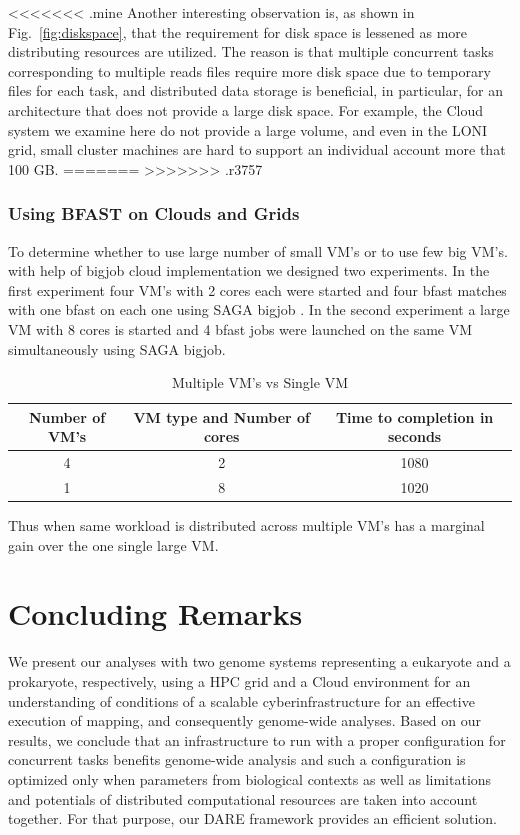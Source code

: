 \documentclass[12pt]{article}
\begin{document}
<<<<<<< .mine
Another interesting observation is, as shown in Fig.~\ref{fig:diskspace}, that the requirement for disk space is lessened as more distributing resources are utilized. The reason is that multiple concurrent tasks corresponding to multiple reads files require more disk space due to temporary files for each task, and distributed data storage is beneficial, in particular, for an architecture that does not provide a large disk space.  For example, the Cloud system we examine here do not provide a large volume, and even in the LONI grid, small cluster machines are hard to support an individual account more that 100 GB.    
=======
>>>>>>> .r3757


\subsubsection{Using BFAST on Clouds and Grids}

To determine whether to use large number of small VM's or to use few big VM's. with help of bigjob cloud implementation we designed two experiments. In the first experiment four VM's with 2 cores each were started and four bfast matches with one bfast on each one using SAGA bigjob . In the second experiment a large VM with 8 cores is started and 4 bfast jobs were launched on the same VM simultaneously using SAGA bigjob.

 \begin{table}
 \begin{tabular}{|c|c|c|} 
 \hline 
Number of VM's & VM type and Number of cores & Time to completion in seconds \\ \hline
4 &  2 & 1080  \\
1 & 8 & 1020\\
 \hline 
 \end{tabular}
 \label{table:cloud VM's} 
 \caption{Multiple VM's vs Single VM}
\end{table}

Thus when same workload is distributed across multiple VM's has a marginal gain over the one single large VM.


\section{Concluding Remarks}
We present our analyses with two genome systems representing a eukaryote and a prokaryote, respectively, using
 a HPC grid and a Cloud environment for an understanding of conditions of a scalable cyberinfrastructure for an effective execution of
 mapping, and consequently genome-wide analyses.   Based on our results, we conclude that an infrastructure to run with a proper configuration for concurrent tasks benefits genome-wide analysis and such a configuration is optimized only when parameters from biological contexts as well as limitations and potentials of distributed computational resources are taken into account together.  For that purpose, our DARE framework provides an efficient solution.  





\end{document}
